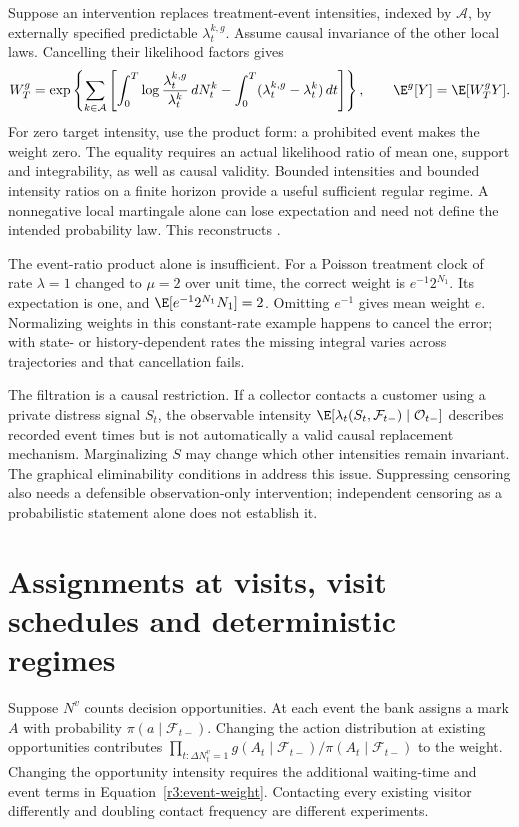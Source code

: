 Suppose an intervention replaces treatment-event intensities, indexed
by $\mathcal A$, by externally specified predictable $\lambda^{k,g}_t$.
Assume causal invariance of the other local laws. Cancelling their
likelihood factors gives
\begin{equation}
 W_T^g=
 \exp\left\{\sum_{k\in\mathcal A}\left[
 \int_0^T\log\frac{\lambda^{k,g}_t}{\lambda^k_t}\,dN^k_t
 -\int_0^T(\lambda^{k,g}_t-\lambda^k_t)\,dt\right]\right\},
 \qquad \E^g[Y]=\E[W_T^gY].
 \label{r3:event-weight}
\end{equation}
For zero target intensity, use the product form: a prohibited event makes
the weight zero. The equality requires an actual likelihood ratio of
mean one, support and integrability, as well as causal validity.
Bounded intensities and bounded intensity ratios on a finite horizon
provide a useful sufficient regular regime. A nonnegative local
martingale alone can lose expectation and need not define the intended
probability law. This reconstructs
\citet[Definition 2 and Proposition 1]{roysland2024}.

The event-ratio product alone is insufficient. For a Poisson treatment
clock of rate $\lambda=1$ changed to $\mu=2$ over unit time, the correct
weight is $e^{-1}2^{N_1}$. Its expectation is one, and
$\E[e^{-1}2^{N_1}N_1]=2$. Omitting $e^{-1}$ gives mean weight $e$.
Normalizing weights in this constant-rate example happens to cancel the
error; with state- or history-dependent rates the missing integral varies
across trajectories and that cancellation fails.

The filtration is a causal restriction. If a collector contacts a customer
using a private distress signal $S_t$, the observable intensity
$\E[\lambda_t(S_t,\mathcal F_{t-})\mid\mathcal O_{t-}]$ describes recorded
event times but is not automatically a valid causal replacement mechanism.
Marginalizing $S$ may change which other intensities remain invariant.
The graphical eliminability conditions in
\citet[Theorem 1 and Section 6]{roysland2024} address this issue.
Suppressing censoring also needs a defensible observation-only intervention;
independent censoring as a probabilistic statement alone does not establish it.

\section{Assignments at visits, visit schedules and deterministic regimes}
\label{r3:event-regimes}
Suppose $N^v$ counts decision opportunities. At each event the bank assigns
a mark $A$ with probability $\pi(a\mid\mathcal F_{t-})$.
Changing the action distribution at existing opportunities contributes
$\prod_{t:\Delta N^v_t=1}g(A_t\mid\mathcal F_{t-})/
\pi(A_t\mid\mathcal F_{t-})$ to the weight. Changing the opportunity
intensity requires the additional waiting-time and event terms in
Equation~\eqref{r3:event-weight}. Contacting every existing visitor
differently and doubling contact frequency are different experiments.

